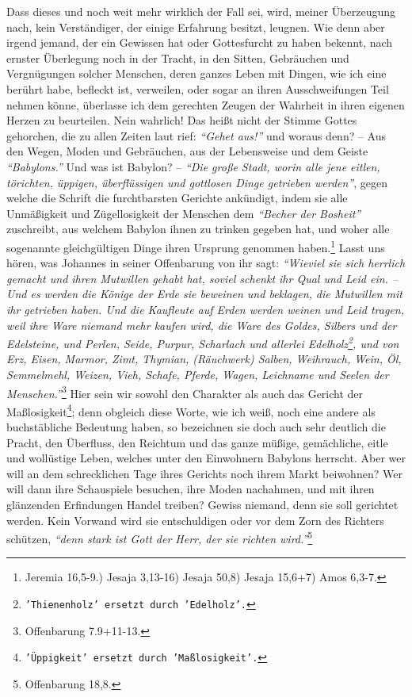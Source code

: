 Dass dieses und noch weit mehr wirklich der Fall sei, wird, meiner Überzeugung
nach, kein Verständiger, der einige Erfahrung besitzt, leugnen. Wie denn aber
irgend jemand, der ein Gewissen hat oder Gottesfurcht zu haben bekennt, nach
ernster Überlegung noch in der Tracht, in den Sitten, Gebräuchen und
Vergnügungen solcher Menschen, deren ganzes Leben mit Dingen, wie ich eine
berührt habe, befleckt ist, verweilen, oder sogar an ihren Ausschweifungen Teil
nehmen könne, überlasse ich dem gerechten Zeugen der Wahrheit in ihren eigenen
Herzen zu beurteilen. Nein wahrlich! Das heißt nicht der Stimme Gottes
gehorchen, die zu allen Zeiten laut rief: \textit{"`Gehet aus!"'} und woraus
denn? -- Aus den Wegen, Moden und Gebräuchen, aus der Lebensweise und dem Geiste
\textit{"`Babylons."'} Und was ist Babylon? --
\textit{"`Die große Stadt, worin alle jene eitlen,
törichten, üppigen, überflüssigen und gottlosen Dinge getrieben werden"'},
gegen
welche die Schrift die furchtbarsten Gerichte ankündigt,
indem sie alle
Unmäßigkeit und Zügellosigkeit der Menschen dem \textit{"`Becher der Bosheit"'}
zuschreibt,
aus welchem Babylon ihnen zu trinken gegeben hat, und woher alle sogenannte
gleichgültigen Dinge ihren Ursprung genommen haben.\footnote{Jeremia 16,5-9.)
Jesaja 3,13-16)
Jesaja 50,8)
Jesaja 15,6+7)
Amos 6,3-7.}
Lasst uns hören, was Johannes in
seiner Offenbarung von ihr sagt:
\textit{"`Wieviel sie sich herrlich gemacht und ihren
Mutwillen gehabt hat, soviel schenkt ihr Qual und Leid ein. -- Und es werden die
Könige der Erde
sie beweinen und beklagen, die Mutwillen mit ihr getrieben
haben. Und die Kaufleute auf Erden werden weinen und Leid tragen, weil ihre
Ware niemand mehr kaufen wird, die Ware des Goldes, Silbers und der
Edelsteine, und Perlen, Seide, Purpur, Scharlach und allerlei
Edelholz\footnote{\texttt{'Thienenholz' ersetzt durch 'Edelholz'.}}, und von Erz,
Eisen, Marmor, Zimt, Thymian,
(Räuchwerk) Salben, Weihrauch, Wein, Öl, Semmelmehl,
Weizen, Vieh, Schafe, Pferde, Wagen, Leichname und Seelen der
Menschen."'}\footnote{Offenbarung 7.9+11-13.}
Hier sein wir sowohl den Charakter
als auch das Gericht der Maßlosigkeit\footnote{\texttt{'Üppigkeit' ersetzt durch
'Maßlosigkeit'.}}; denn obgleich diese
Worte, wie ich weiß,
noch eine andere als buchstäbliche Bedeutung
haben, so
bezeichnen sie
doch auch
sehr deutlich die Pracht, den Überfluss, den Reichtum und das ganze müßige,
gemächliche, eitle und wollüstige Leben, welches unter den Einwohnern
Babylons
herrscht. Aber wer will an dem schrecklichen Tage ihres
Gerichts noch ihrem
Markt beiwohnen? Wer will dann ihre Schauspiele besuchen, ihre Moden nachahmen,
und mit ihren glänzenden Erfindungen Handel treiben? Gewiss niemand, denn sie
soll gerichtet werden. Kein Vorwand wird sie entschuldigen oder vor dem Zorn
des Richters schützen,
\textit{"`denn stark ist Gott der Herr, der sie richten
wird."'}\footnote{Offenbarung 18,8.}

